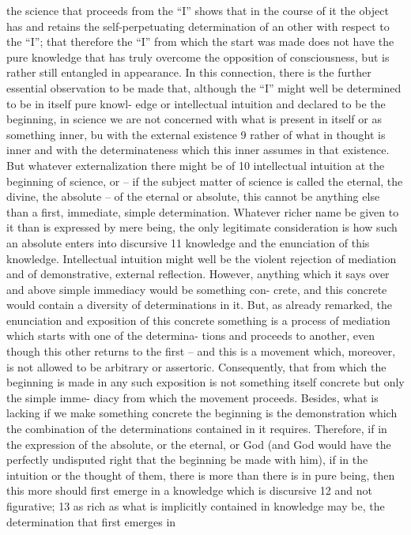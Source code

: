 the science that proceeds from the “I” shows that in the course of it the
object has and retains the self-perpetuating determination of an other with
respect to the “I”; that therefore the “I” from which the start was made
does not have the pure knowledge that has truly overcome the opposition
of consciousness, but is rather still entangled in appearance.
In this connection, there is the further essential observation to be made
that, although the “I” might well be determined to be in itself pure knowl-
edge or intellectual intuition and declared to be the beginning, in science
we are not concerned with what is present in itself or as something inner, bu
with the external existence 9 rather of what in thought is inner and with the
determinateness which this inner assumes in that existence. But whatever
externalization there might be of 10 intellectual intuition at the beginning of
science, or – if the subject matter of science is called the eternal, the divine,
the absolute – of the eternal or absolute, this cannot be anything else than a
first, immediate, simple determination. Whatever richer name be given to
it than is expressed by mere being, the only legitimate consideration is how
such an absolute enters into discursive 11 knowledge and the enunciation of
this knowledge. Intellectual intuition might well be the violent rejection
of mediation and of demonstrative, external reflection. However, anything
which it says over and above simple immediacy would be something con-
crete, and this concrete would contain a diversity of determinations in it.
But, as already remarked, the enunciation and exposition of this concrete
something is a process of mediation which starts with one of the determina-
tions and proceeds to another, even though this other returns to the first –
and this is a movement which, moreover, is not allowed to be arbitrary
or assertoric. Consequently, that from which the beginning is made in any
such exposition is not something itself concrete but only the simple imme-
diacy from which the movement proceeds. Besides, what is lacking if we
make something concrete the beginning is the demonstration which the
combination of the determinations contained in it requires.
Therefore, if in the expression of the absolute, or the eternal, or God (and
God would have the perfectly undisputed right that the beginning be made
with him), if in the intuition or the thought of them, there is more than
there is in pure being, then this more should first emerge in a knowledge
which is discursive 12 and not figurative; 13 as rich as what is implicitly
contained in knowledge may be, the determination that first emerges in
